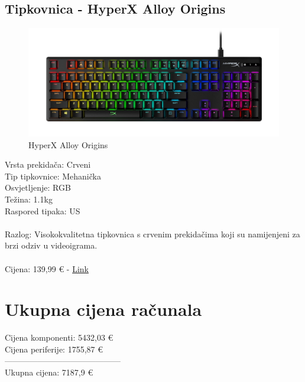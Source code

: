 \documentclass{report}
\begin{document}
\section{Tipkovnica - HyperX Alloy Origins}
\begin{figure}[H]
    \centering
    \includegraphics[scale=0.25]{Slike/tipkovnica.jpg}
    \caption{HyperX Alloy Origins}
    \label{fig:tipkovnica}
\end{figure}
Vrsta prekidača: Crveni\\Tip tipkovnice: Mehanička\\Osvjetljenje: RGB\\Težina: 1.1kg\\Raspored tipaka: US\\\\Razlog: Visokokvalitetna tipkovnica s crvenim prekidačima koji su namijenjeni za brzi odziv u videoigrama.\\\\Cijena: 139,99 € - \href{https://www.links.hr/hr/tipkovnica-hyperx-alloy-origins-mehanicka-hyperx-red-crna-hx-kb6rdx-us-usb-101200508}{Link}

\pagebreak

\chapter{Ukupna cijena računala}
Cijena komponenti: 5432,03 €\\Cijena periferije: 1755,87 €\\------------------------------------------\\Ukupna cijena: 7187,9 €
\end{document}
